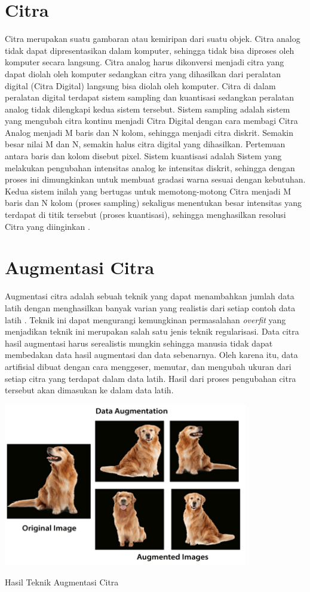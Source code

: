 \section{Citra}
Citra merupakan suatu gambaran atau kemiripan dari suatu objek. Citra analog tidak dapat dipresentasikan dalam komputer, sehingga tidak bisa diproses oleh komputer secara langsung. Citra analog harus dikonversi menjadi citra yang dapat diolah oleh komputer sedangkan citra yang dihasilkan dari peralatan digital (Citra Digital) langsung bisa diolah oleh komputer. Citra di dalam peralatan digital terdapat sistem sampling dan kuantisasi sedangkan peralatan analog tidak dilengkapi kedua sistem tersebut. Sistem sampling adalah sistem yang mengubah citra kontinu menjadi Citra Digital dengan cara membagi Citra Analog menjadi M baris dan N kolom, sehingga menjadi citra diskrit. Semakin besar nilai M dan N, semakin halus citra digital yang dihasilkan. Pertemuan antara baris dan kolom disebut pixel. Sistem kuantisasi adalah Sistem yang melakukan pengubahan intensitas analog ke intensitas diskrit, sehingga dengan proses ini dimungkinkan untuk membuat gradasi warna sesuai dengan kebutuhan. Kedua sistem inilah yang bertugas untuk memotong-motong Citra menjadi M baris dan N kolom (proses sampling) sekaligus menentukan besar intensitas yang terdapat di titik tersebut (proses kuantisasi), sehingga menghasilkan resolusi Citra yang diinginkan \cite{andono2017}.

\section{Augmentasi Citra}
Augmentasi citra adalah sebuah teknik yang dapat menambahkan jumlah data latih dengan menghasilkan banyak varian yang realistis dari setiap contoh data latih \cite{geron2019}. Teknik ini dapat mengurangi kemungkinan permasalahan \textit{overfit} yang menjadikan teknik ini merupakan salah satu jenis teknik regularisasi. Data citra hasil augmentasi harus serealistis mungkin sehingga manusia tidak dapat membedakan data hasil augmentasi dan data sebenarnya. Oleh karena itu, data artifisial dibuat dengan cara menggeser, memutar, dan mengubah ukuran dari setiap citra yang terdapat dalam data latih. Hasil dari proses pengubahan citra tersebut akan dimasukan ke dalam data latih.
\begin{afigure}
    \includegraphics[width=0.8\textwidth, center]{images/Picture4.png}
    \caption{Hasil Teknik Augmentasi Citra}
    \label{fig:augmentasi-citra} 
\end{afigure}


